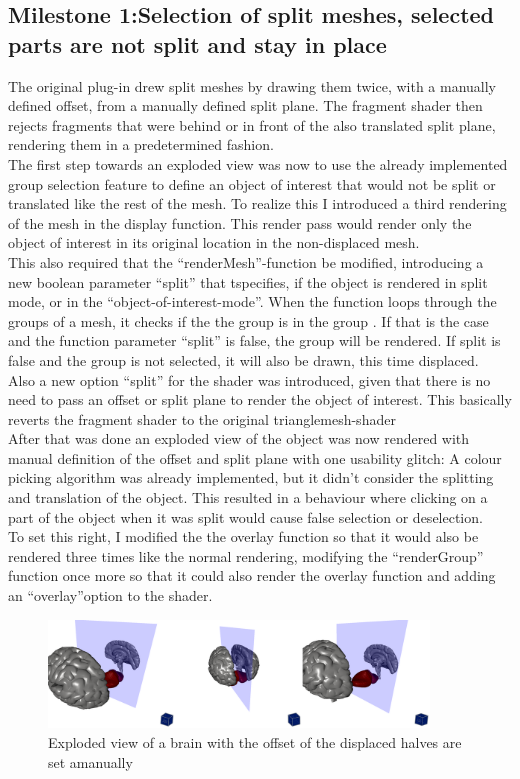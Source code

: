 \subsection{Milestone 1:Selection of split meshes, selected parts are not split and stay in place} The original plug-in drew split meshes by drawing them twice, with a manually defined offset, from a manually defined split plane. The fragment shader then rejects fragments that were behind or in front of the also translated split plane, rendering them in a predetermined fashion.\\
The first step towards an exploded view was now to use the already implemented group selection feature to define an object of interest that would not be split or translated like the rest of the mesh. To realize this I introduced a third rendering of the mesh in the display function. This render pass would render only the object of interest in its original location in the non-displaced mesh.\\
This also required that the ``renderMesh''-function be modified, introducing a new boolean parameter ``split'' that tspecifies, if the object is rendered in split mode, or in the ``object-of-interest-mode''. When the function loops through the groups of a mesh, it checks if the the group is in the group . If that is the case and the function parameter ``split'' is false, the group will be rendered. If split is false and the group is not selected, it will also be drawn, this time displaced.\\
Also a new option ``split'' for the shader was introduced, given that there is no need to pass an offset or split plane to render the object of interest. This basically reverts the fragment shader to the original trianglemesh-shader\\
After that was done an exploded view of the object was now rendered with manual definition of the offset and split plane with one usability glitch: A colour picking algorithm was already implemented, but it didn't consider the splitting and translation of the object. This resulted in a behaviour where clicking on a part of the object when it was split would cause false selection or deselection. \\
To set this right, I modified the the overlay function so that it would also be rendered three times like the normal rendering, modifying the ``renderGroup'' function once more  so that it could also render the overlay function and adding an ``overlay''option to the shader.
\begin{figure}[tb]
	\centering
	\includegraphics[width=0.9\textwidth]{chapters/figures/cerebellum}
	\caption{Exploded view of a brain with the offset of the displaced halves are set amanually}
	\label{fig:cerebellum}
\end{figure}

